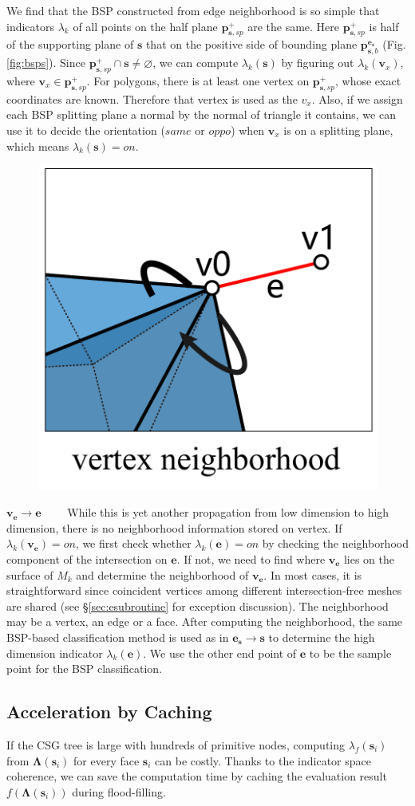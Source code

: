 \documentclass[10pt,journal,compsoc]{IEEEtran}
\begin{document}
We find that the BSP constructed from edge neighborhood is so simple that indicators $\lambda_k$ of all points on the half plane $\bm{p}_{\bm{s}, sp}^+$ are the same. Here $\bm{p}_{\bm{s}, sp}^+$ is half of the supporting plane of $\bm{s}$ that on the positive side of bounding plane $\bm{p}_{\bm{s}, b}^{\bm{e}_{\bm{s}}}$ (Fig. \ref{fig:bsps}). Since $\bm{p}_{\bm{s}, sp}^+ \cap \bm{s} \neq \varnothing$, we can compute $\lambda_k(\bm{s})$ by figuring out $\lambda_k(\bm{v}_x)$, where $\bm{v}_x \in \bm{p}_{\bm{s}, sp}^+$. For polygons, there is at least one vertex on $\bm{p}_{\bm{s}, sp}^+$, whose exact coordinates are known. Therefore that vertex is used as the $v_x$. Also, if we assign each BSP splitting plane a normal by the normal of triangle it contains, we can use it to decide the orientation ($same$ or $oppo$) when $\bm{v}_x$ is on a splitting plane, which means $\lambda_k(\bm{s})=on$.

\vspace{0.5em}
\begin{figure}
 \includegraphics[width=1.3 in]{vneighbor}
\end{figure}
\noindent\textbf{$\bm{\bm{v}_{\bm{e}}\to e}$}~~~~ While this is yet another propagation from low dimension to high dimension, there is no neighborhood information stored on vertex. If $\lambda_k(\bm{v}_{\bm{e}})=on$, we first check whether $\lambda_k(\bm{e}) = on$ by checking the neighborhood component of the intersection on $\bm{e}$. If not, we need to find where $\bm{v}_{\bm{e}}$ lies on the surface of $M_k$ and determine the neighborhood of $\bm{v}_{\bm{e}}$. In most cases, it is straightforward since coincident vertices among different intersection-free meshes are shared (see \S\ref{sec:esubroutine} for exception discussion). The neighborhood may be a vertex, an edge or a face. After computing the neighborhood, the same BSP-based classification method is used as in ${\bm{e}_{\bm{s}}\to \bm{s}}$ to determine the high dimension indicator $\lambda_k(\bm{e})$. We use the other end point of $\bm{e}$ to be the sample point for the BSP classification.


\subsection{Acceleration by Caching}
\label{sec:acc}
If the CSG tree is large with hundreds of primitive nodes, computing $\lambda_f(\bm{s}_i)$ from $\boldsymbol{\Lambda}(\bm{s}_i)$ for every face $\bm{s}_i$ can be costly. Thanks to the indicator space coherence, we can save the computation time by caching the evaluation result $f(\boldsymbol{\Lambda}(\bm{s}_i))$ during flood-filling.
\end{document}
